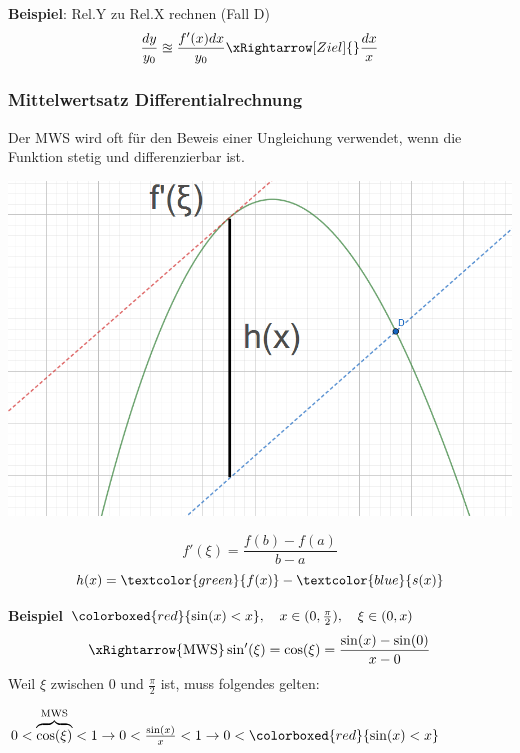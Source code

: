 \noindent\textbf{Beispiel}: Rel.Y zu Rel.X rechnen (Fall D)
\[
\dfrac{dy}{y_0} \approxeq \dfrac{f'(x)dx}{y_0} \xRightarrow[Ziel]{}\dfrac{dx}{x}
\]

\subsubsection{Mittelwertsatz Differentialrechnung}
Der MWS  wird oft für den Beweis einer Ungleichung verwendet, wenn die Funktion stetig und differenzierbar ist.
\begin{minipage}{\textwidth}	
	\begin{minipage}{0.2\textwidth}
		\includegraphics[width=\linewidth,keepaspectratio=true]{./Images/Mittelwertsatz.png}
	\end{minipage}%
	\begin{minipage}{0.3\textwidth}	
		\[f'(\xi) = \frac{f(b) - f(a)}{b - a}\] 
		\[ h(x) = \textcolor{green}{f(x)} - \textcolor{blue}{s(x)} \]
	\end{minipage}
\end{minipage}

\noindent\textbf{Beispiel} $\colorboxed{red}{\sin(x) < x},\quad x \in (0, \frac{\pi}{2}),\quad \xi \in (0, x)$
\[\xRightarrow{\text{MWS}} \sin'(\xi) = \cos(\xi) = \frac{\sin(x) - \sin(0)}{x - 0}\]
Weil $\xi$ zwischen 0 und $\frac{\pi}{2}$ ist, muss folgendes gelten: 

$
0 < \overbrace{\cos(\xi)}^{\text{MWS}} < 1 \rightarrow 0 < \frac{\sin(x)}{x} < 1 \rightarrow 0 < \colorboxed{red}{\sin(x) < x}
$


